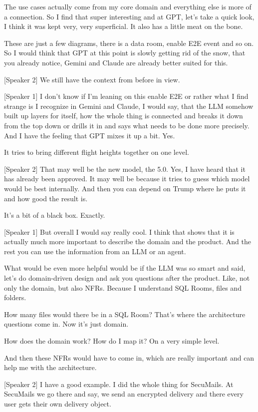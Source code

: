 The use cases actually come from my core domain and everything else is more of a connection. So I find that super interesting and at GPT, let's take a quick look, I think it was kept very, very superficial. It also has a little meat on the bone.

These are just a few diagrams, there is a data room, enable E2E event and so on. So I would think that GPT at this point is slowly getting rid of the snow, that you already notice, Gemini and Claude are already better suited for this.

[Speaker 2]
We still have the context from before in view.

[Speaker 1]
I don't know if I'm leaning on this enable E2E or rather what I find strange is I recognize in Gemini and Claude, I would say, that the LLM somehow built up layers for itself, how the whole thing is connected and breaks it down from the top down or drills it in and says what needs to be done more precisely. And I have the feeling that GPT mixes it up a bit. Yes.

It tries to bring different flight heights together on one level.

[Speaker 2]
That may well be the new model, the 5.0. Yes, I have heard that it has already been approved. It may well be because it tries to guess which model would be best internally. And then you can depend on Trump where he puts it and how good the result is.

It's a bit of a black box. Exactly.

[Speaker 1]
But overall I would say really cool. I think that shows that it is actually much more important to describe the domain and the product. And the rest you can use the information from an LLM or an agent.

What would be even more helpful would be if the LLM was so smart and said, let's do domain-driven design and ask you questions after the product. Like, not only the domain, but also NFRs. Because I understand SQL Rooms, files and folders.

How many files would there be in a SQL Room? That's where the architecture questions come in. Now it's just domain.

How does the domain work? How do I map it? On a very simple level.

And then these NFRs would have to come in, which are really important and can help me with the architecture.

[Speaker 2]
I have a good example. I did the whole thing for SecuMails. At SecuMails we go there and say, we send an encrypted delivery and there every user gets their own delivery object.

